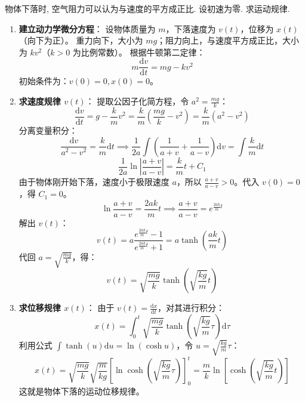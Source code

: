\documentclass[lang=cn,11pt]{elegantbook}
\begin{document}
\begin{exercise}[动力学与微分方程]
物体下落时, 空气阻力可以认为与速度的平方成正比. 设初速为零. 求运动规律.
\end{exercise}
\begin{solution}
\begin{enumerate}
    \item \textbf{建立动力学微分方程}：
    设物体质量为 $m$，下落速度为 $v(t)$，位移为 $x(t)$（向下为正）。
    重力向下，大小为 $mg$；阻力向上，与速度平方成正比，大小为 $kv^2$（$k>0$ 为比例常数）。
    根据牛顿第二定律：
    \[
    m \frac{\mathrm{d}v}{\mathrm{d}t} = mg - kv^2
    \]
    初始条件为：$v(0) = 0, x(0) = 0$。
    
    \item \textbf{求速度规律 $v(t)$}：
    提取公因子化简方程，令 $a^2 = \frac{mg}{k}$：
    \[
    \frac{\mathrm{d}v}{\mathrm{d}t} = g - \frac{k}{m}v^2 = \frac{k}{m} \left( \frac{mg}{k} - v^2 \right) = \frac{k}{m}(a^2 - v^2)
    \]
    分离变量积分：
    \[
    \frac{\mathrm{d}v}{a^2 - v^2} = \frac{k}{m} \mathrm{d}t \implies \frac{1}{2a} \int \left( \frac{1}{a+v} + \frac{1}{a-v} \right) \mathrm{d}v = \int \frac{k}{m} \mathrm{d}t
    \]
    \[
    \frac{1}{2a} \ln \left| \frac{a+v}{a-v} \right| = \frac{k}{m} t + C_1
    \]
    由于物体刚开始下落，速度小于极限速度 $a$，所以 $\frac{a+v}{a-v} > 0$。代入 $v(0)=0$，得 $C_1 = 0$。
    \[
    \ln \frac{a+v}{a-v} = \frac{2ak}{m} t \implies \frac{a+v}{a-v} = e^{\frac{2ak}{m}t}
    \]
    解出 $v(t)$：
    \[
    v(t) = a \frac{e^{\frac{2ak}{m}t} - 1}{e^{\frac{2ak}{m}t} + 1} = a \tanh\left(\frac{ak}{m} t\right)
    \]
    代回 $a = \sqrt{\frac{mg}{k}}$，得：
    \[
    v(t) = \sqrt{\frac{mg}{k}} \tanh\left(\sqrt{\frac{kg}{m}} t\right)
    \]
    
    \item \textbf{求位移规律 $x(t)$}：
    由于 $v(t) = \frac{\mathrm{d}x}{\mathrm{d}t}$，对其进行积分：
    \[
    x(t) = \int_0^t \sqrt{\frac{mg}{k}} \tanh\left(\sqrt{\frac{kg}{m}} \tau\right) \mathrm{d}\tau
    \]
    利用公式 $\int \tanh(u) \mathrm{d}u = \ln(\cosh u)$，令 $u = \sqrt{\frac{kg}{m}} \tau$：
    \[
    x(t) = \sqrt{\frac{mg}{k}} \sqrt{\frac{m}{kg}} \left[ \ln\cosh\left(\sqrt{\frac{kg}{m}} \tau\right) \right]_0^t = \frac{m}{k} \ln\left[\cosh\left(\sqrt{\frac{kg}{m}} t\right)\right]
    \]
    这就是物体下落的运动位移规律。
\end{enumerate}
\end{solution}
\end{document}
